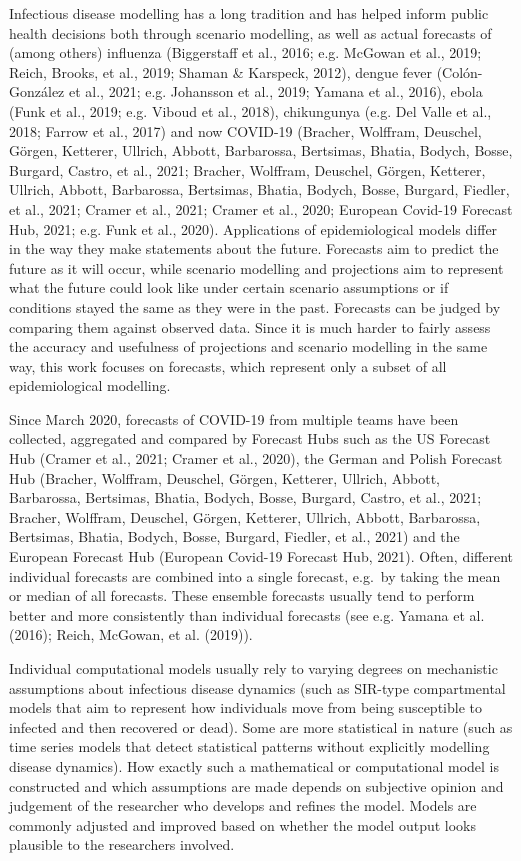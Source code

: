 \documentclass[
]{article}
\begin{document}
Infectious disease modelling has a long tradition and has helped inform public health decisions both through scenario modelling, as well as actual forecasts of (among others) influenza (Biggerstaff et al., 2016; e.g. McGowan et al., 2019; Reich, Brooks, et al., 2019; Shaman \& Karspeck, 2012), dengue fever (Colón-González et al., 2021; e.g. Johansson et al., 2019; Yamana et al., 2016), ebola (Funk et al., 2019; e.g. Viboud et al., 2018), chikungunya (e.g. Del Valle et al., 2018; Farrow et al., 2017) and now COVID-19 (Bracher, Wolffram, Deuschel, Görgen, Ketterer, Ullrich, Abbott, Barbarossa, Bertsimas, Bhatia, Bodych, Bosse, Burgard, Castro, et al., 2021; Bracher, Wolffram, Deuschel, Görgen, Ketterer, Ullrich, Abbott, Barbarossa, Bertsimas, Bhatia, Bodych, Bosse, Burgard, Fiedler, et al., 2021; Cramer et al., 2021; Cramer et al., 2020; European Covid-19 Forecast Hub, 2021; e.g. Funk et al., 2020). Applications of epidemiological models differ in the way they make statements about the future. Forecasts aim to predict the future as it will occur, while scenario modelling and projections aim to represent what the future could look like under certain scenario assumptions or if conditions stayed the same as they were in the past. Forecasts can be judged by comparing them against observed data. Since it is much harder to fairly assess the accuracy and usefulness of projections and scenario modelling in the same way, this work focuses on forecasts, which represent only a subset of all epidemiological modelling.

Since March 2020, forecasts of COVID-19 from multiple teams have been collected, aggregated and compared by Forecast Hubs such as the US Forecast Hub (Cramer et al., 2021; Cramer et al., 2020), the German and Polish Forecast Hub (Bracher, Wolffram, Deuschel, Görgen, Ketterer, Ullrich, Abbott, Barbarossa, Bertsimas, Bhatia, Bodych, Bosse, Burgard, Castro, et al., 2021; Bracher, Wolffram, Deuschel, Görgen, Ketterer, Ullrich, Abbott, Barbarossa, Bertsimas, Bhatia, Bodych, Bosse, Burgard, Fiedler, et al., 2021) and the European Forecast Hub (European Covid-19 Forecast Hub, 2021). Often, different individual forecasts are combined into a single forecast, e.g.~by taking the mean or median of all forecasts. These ensemble forecasts usually tend to perform better and more consistently than individual forecasts (see e.g. Yamana et al. (2016); Reich, McGowan, et al. (2019)).

Individual computational models usually rely to varying degrees on mechanistic assumptions about infectious disease dynamics (such as SIR-type compartmental models that aim to represent how individuals move from being susceptible to infected and then recovered or dead). Some are more statistical in nature (such as time series models that detect statistical patterns without explicitly modelling disease dynamics). How exactly such a mathematical or computational model is constructed and which assumptions are made depends on subjective opinion and judgement of the researcher who develops and refines the model. Models are commonly adjusted and improved based on whether the model output looks plausible to the researchers involved.
\end{document}

